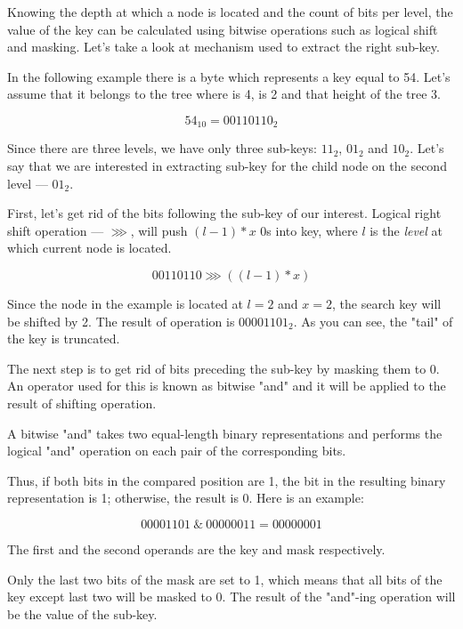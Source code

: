 Knowing the depth at which a node is located and the count of bits per level, the value of the key can be calculated using bitwise operations such as logical shift and masking. Let's take a look at mechanism used to extract the right sub-key. 

In the following example there is a byte which represents a key equal to 54. Let's assume that it belongs to the tree where \m{} is 4, \x{} is 2 and that height of the tree 3. 

\begin{equation}
    54_{10} = 00110110_2    
\end{equation}

Since there are three levels, we have only three sub-keys: $11_2$, $01_2$ and $10_2$. Let's say that we are interested in extracting sub-key for the child node on the second level --- $01_2$. 

First, let's get rid of the bits following the sub-key of our interest. Logical right shift operation --- $\ggg$, will push $(l - 1) * x$ 0s into key, where $l$ is the \emph{level} at which current node is located. 

\begin{equation}
    00110110 \ggg ((l - 1) * x)
\end{equation}

Since the node in the example is located at $l = 2$ and $x = 2$, the search key will be shifted by 2. The result of operation is $00001101_2$. As you can see, the "tail" of the key is truncated.

The next step is to get rid of bits preceding the sub-key by masking them to 0. An operator used for this is known as bitwise "and" and it will be applied to the result of shifting operation. 

A bitwise "and" takes two equal-length binary representations and performs the logical "and" operation on each pair of the corresponding bits. 

Thus, if both bits in the compared position are 1, the bit in the resulting binary representation is 1; otherwise, the result is 0. Here is an example:

\begin{equation}
    00001101 \ \& \ 00000011 = 00000001
\end{equation}
                                    
The first and the second operands are the key and mask respectively. 

Only the last two bits of the mask are set to 1, which means that all bits of the key except last two will be masked to 0. The result of the "and"-ing operation will be the value of the sub-key.

